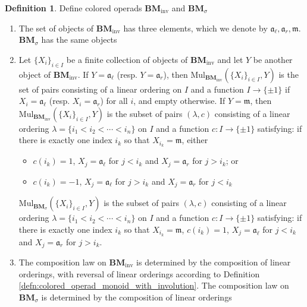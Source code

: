 \documentclass{article}
\theoremstyle{definition}
\newtheorem{definition}[equation]{Definition}
\begin{document}
\begin{definition}\label{defn:inv_bimod_operad}
    Define colored operads $ \mathbf{BM}_\mathrm{inv} $ and $ \mathbf{BM}_\sigma $
    \begin{enumerate}[label=(\roman*)]
        \item The set of objects of $ \mathbf{BM}_\mathrm{inv} $ has three elements, which we denote by $ \mathfrak{a}_\ell, \mathfrak{a}_r, \mathfrak{m} $. 
        $ \mathbf{BM}_\sigma $ has the same objects
        \item Let $ \{X_i\}_{i \in I} $ be a finite collection of objects of $ \mathbf{BM}_{\mathrm{inv}} $ and let $ Y $ be another object of $ \mathbf{BM}_{\mathrm{inv}} $. 
        If $ Y = \mathfrak{a}_\ell $ (resp. $ Y = \mathfrak{a}_r $), then $ \mathrm{Mul}_{\mathbf{BM}_\mathrm{inv}} \left(\{X_i\}_{i \in I}, Y\right) $ is the set of pairs consisting of a linear ordering on $ I $ and a function $ I \to \{\pm 1\} $ if $ X_i = \mathfrak{a}_\ell $ (resp. $ X_i = \mathfrak{a}_r $) for all $ i $, and empty otherwise. 
        If $ Y = \mathfrak{m} $, then $ \mathrm{Mul}_{\mathbf{BM}_\mathrm{inv}} \left(\{X_i\}_{i \in I}, Y\right) $ is the subset of pairs $ (\lambda, c) $ consisting of a linear ordering $ \lambda = \{i_1 < i_2 < \cdots < i_n\} $ on $ I $ and a function $ c \colon I \to \{\pm 1 \} $ satisfying: if  there is exactly one index $ i_k $ so that $ X_{i_k} = \mathfrak{m} $, either
        \begin{itemize}
            \item $ c(i_k) = 1 $, $ X_{j} = \mathfrak{a}_\ell $ for $ j < i_k $ and $ X_j = \mathfrak{a}_{r} $ for $ j > i_k $; or
            \item $ c(i_k) = - 1 $, $ X_{j} = \mathfrak{a}_\ell $ for $ j > i_k $ and $ X_j = \mathfrak{a}_{r} $ for $ j < i_k $ 
        \end{itemize}
        $ \mathrm{Mul}_{\mathbf{BM}_\sigma} \left(\{X_i\}_{i \in I}, Y\right) $ is the subset of pairs $ (\lambda, c) $ consisting of a linear ordering $ \lambda = \{i_1 < i_2 < \cdots < i_n\} $ on $ I $ and a function $ c \colon I \to \{\pm 1 \} $ satisfying: if  there is exactly one index $ i_k $ so that $ X_{i_k} = \mathfrak{m} $, $ c(i_k) = 1 $, $ X_{j} = \mathfrak{a}_\ell $ for $ j < i_k $ and $ X_j = \mathfrak{a}_{r} $ for $ j > i_k $. 
        \item The composition law on $ \mathbf{BM}_{\mathrm{inv}} $ is determined by the composition of linear orderings, with reversal of linear orderings according to Definition \ref{defn:colored_operad_monoid_with_involution}. 
        The composition law on $ \mathbf{BM}_{\sigma} $ is determined by the composition of linear orderings 
    \end{enumerate}
\end{definition} 
\end{document}
